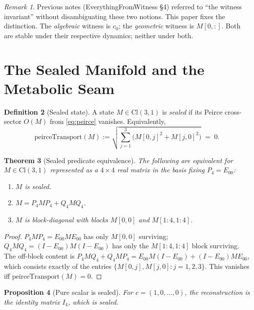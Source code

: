 \documentclass[11pt,a4paper]{article}
\theoremstyle{plain}
\newtheorem{theorem}{Theorem}[section]
\newtheorem{proposition}[theorem]{Proposition}
\theoremstyle{definition}
\newtheorem{definition}[theorem]{Definition}
\theoremstyle{remark}
\newtheorem{remark}[theorem]{Remark}
\numberwithin{equation}{section}
\providecommand{\Cl}{\mathrm{Cl}}
\providecommand{\Pf}{P_4}
\providecommand{\Qf}{Q_4}
\begin{document}
\begin{remark}
Previous notes (EverythingFromWitness §4) referred to ``the
witness invariant'' without disambiguating these two notions.
This paper fixes the distinction. The \emph{algebraic} witness is
$c_0$; the \emph{geometric} witness is $M[0,:]$. Both are stable
under their respective dynamics; neither under both.
\end{remark}

\section{The Sealed Manifold and the Metabolic Seam}
\label{sec:seal}

\begin{definition}[Sealed state]
\label{def:sealed}
A state $M \in \Cl(3,1)$ is \emph{sealed} if its Peirce cross-sector
$O(M)$ from \eqref{eq:peirce} vanishes. Equivalently,
\[
\mathrm{peirceTransport}(M) := \sqrt{\sum_{j=1}^{3}\!\big(M[0,j]^2 + M[j,0]^2\big)} \;=\; 0.
\]
\end{definition}

\begin{theorem}[Sealed predicate equivalence]
\label{thm:sealed}
The following are equivalent for $M \in \Cl(3,1)$ represented as a
$4 \times 4$ real matrix in the basis fixing $\Pf = E_{00}$:
\begin{enumerate}[label=(\roman*)]
\item $M$ is sealed.
\item $M = \Pf M \Pf + \Qf M \Qf$.
\item $M$ is block-diagonal with blocks $M[0,0]$ and $M[1{:}4, 1{:}4]$.
\end{enumerate}
\end{theorem}

\begin{proof}
$\Pf M \Pf = E_{00} M E_{00}$ has only $M[0,0]$ surviving;
$\Qf M \Qf = (I - E_{00}) M (I - E_{00})$ has only the
$M[1{:}4, 1{:}4]$ block surviving. The off-block content is
$\Pf M \Qf + \Qf M \Pf = E_{00} M (I - E_{00}) + (I - E_{00}) M E_{00}$,
which consists exactly of the entries $\{M[0,j], M[j,0] : j = 1, 2, 3\}$.
This vanishes iff $\mathrm{peirceTransport}(M) = 0$.
\end{proof}

\begin{proposition}[Pure scalar is sealed]
\label{prop:scalar-sealed}
For $c = (1, 0, \ldots, 0)$, the reconstruction is the identity
matrix $I_4$, which is sealed.
\end{proposition}
\end{document}

